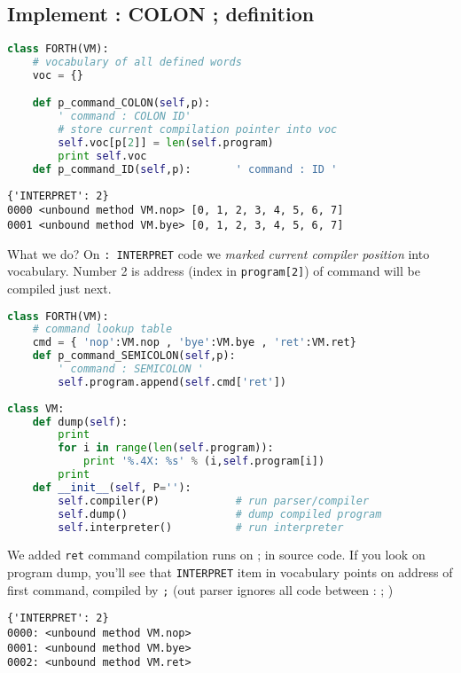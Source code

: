\clearpage
\subsection{Implement : COLON ; definition}

\begin{lstlisting}[language=Python]
class FORTH(VM):
	# vocabulary of all defined words
	voc = {}

  	def p_command_COLON(self,p):
  		' command : COLON ID'
  		# store current compilation pointer into voc
  		self.voc[p[2]] = len(self.program)
  		print self.voc
  	def p_command_ID(self,p):		' command : ID '
\end{lstlisting}
\begin{lstlisting}
{'INTERPRET': 2}
0000 <unbound method VM.nop> [0, 1, 2, 3, 4, 5, 6, 7]
0001 <unbound method VM.bye> [0, 1, 2, 3, 4, 5, 6, 7]
\end{lstlisting}
What we do? On \verb|: INTERPRET| code we \emph{marked current compiler
position} into vocabulary. Number 2 is address (index in \verb|program[2]|) of
command will be compiled just next.
\begin{lstlisting}[language=Python]
class FORTH(VM):
	# command lookup table
	cmd = { 'nop':VM.nop , 'bye':VM.bye , 'ret':VM.ret}
 	def p_command_SEMICOLON(self,p):
 		' command : SEMICOLON '
 		self.program.append(self.cmd['ret'])
 		
class VM:
  	def dump(self):	
  		print
  		for i in range(len(self.program)):
  			print '%.4X: %s' % (i,self.program[i])
  		print
	def __init__(self, P=''):
		self.compiler(P)			# run parser/compiler
		self.dump()					# dump compiled program
		self.interpreter()		  	# run interpreter
\end{lstlisting}
We added \verb|ret| command compilation runs on ; in source code. If you look on
program dump, you'll see that \verb|INTERPRET| item in vocabulary points on
address of first command, compiled by \verb|;| (out parser ignores all code
between :
; )
\begin{lstlisting}
{'INTERPRET': 2}
0000: <unbound method VM.nop>
0001: <unbound method VM.bye>
0002: <unbound method VM.ret>
\end{lstlisting}

\clearpage

